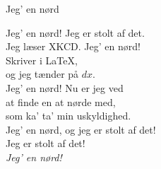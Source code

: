\begin{song}{Jeg' en nørd}
  \begin{SBChorus}
    Jeg' en nørd! Jeg er stolt af det.\\
    Jeg læser XKCD. Jeg' en nørd!\\
    Skriver i \LaTeX,\\
    og jeg tænder på $dx$.\\\medskip
    Jeg' en nørd! Nu er jeg ved\\
    at finde en at nørde med,\\
    som ka’ ta’ min uskyldighed.\\
    Jeg' en nørd, og jeg er stolt af det!\\\medskip
    Jeg er stolt af det!\\\medskip
    \emph{Jeg' en nørd!}
  \end{SBChorus}

  \begin{SBSection*}
  \end{SBSection*}
\end{song}
